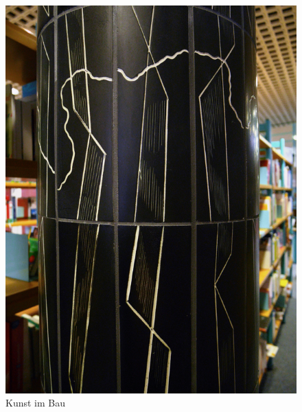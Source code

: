 \documentclass[a4paper,
fontsize=11pt,
oneside,
numbers=noperiodatend,
parskip=half-,
bibliography=totoc,
final
]{scrartcl}
\begin{document}
\begin{figure}
\centering
\includegraphics{img/image_3.jpg}
\caption{Kunst im Bau}
\end{figure}
\end{document}

